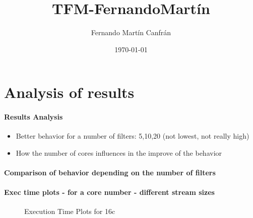 \documentclass[12pt,a4paper]{article}
\title{TFM-FernandoMartín}
\author{Fernando Martín Canfrán}
\date{\today}
\begin{document}
\maketitle


\newpage
\newpage
\section{Analysis of results}

\paragraph{Results Analysis\\}

\begin{itemize}
    \item Better behavior for a number of filters: 5,10,20 (not lowest, not really high)
    \item How the number of cores influences in the improve of the behavior
\end{itemize}

\paragraph{Comparison of behavior depending on the number of filters}

\paragraph{Exec time plots - for a core number - different stream sizes\\}
\newpage
\begin{figure}[H]
    \centering
    
    \vspace{0.5cm} %


    \caption{Execution Time Plots for 16c}
    \label{img:exps-small-execTime-16c}
\end{figure}
\end{document}
